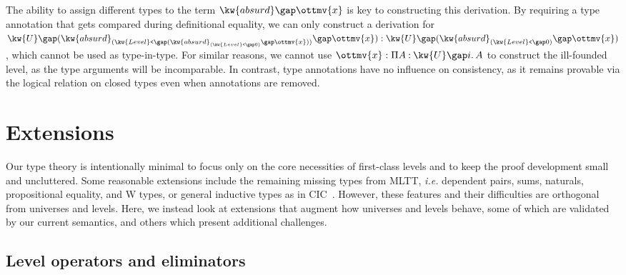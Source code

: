 \documentclass[a4paper,UKenglish,cleveref,autoref,thm-restate]{lipics-v2021}
\makeatletter
\newcommand{\citep}[1]{\cite{#1}}
\newcommand{\ie}{\textit{i.e.}\@\xspace}
\makeatother
\begin{document}
The ability to assign different types to the term $ \kw{absurd} \gap  \ottmv{x} $ is key to constructing this derivation.
By requiring a type annotation that gets compared during definitional equality,
we can only construct a derivation for
$ \kw{U} \gap   (  \kw{absurd}_{  (  \kw{Level}\texttt{<} \gap   (  \kw{absurd}_{  (  \kw{Level}\texttt{<} \gap   0   )  } \gap  \ottmv{x}  )   )  } \gap  \ottmv{x}  )   :  \kw{U} \gap   (  \kw{absurd}_{  (  \kw{Level}\texttt{<} \gap   0   )  } \gap  \ottmv{x}  )  $,
which cannot be used as type-in-type.
For similar reasons, we cannot use $\ottmv{x} :  \Pi  A  \mathbin{:}   \kw{U} \gap  i   \mathpunct{.}  A $
to construct the ill-founded level, as the type arguments will be incomparable.
In contrast, type annotations have no influence on consistency,
as it remains provable via the logical relation on closed types
even when annotations are removed.

\section{Extensions} \label{sec:extensions}

Our type theory is intentionally minimal to focus only on the core necessities
of first-class levels and to keep the proof development small and uncluttered.
Some reasonable extensions include the remaining missing types from MLTT,
\ie dependent pairs, sums, naturals, propositional equality, and W types,
or general inductive types as in CIC~\citep{pcuic}.
However, these features and their difficulties are orthogonal from universes and levels.
Here, we instead look at extensions that augment how universes and levels behave,
some of which are validated by our current semantics,
and others which present additional challenges.

\subsection{Level operators and eliminators}
\end{document}
